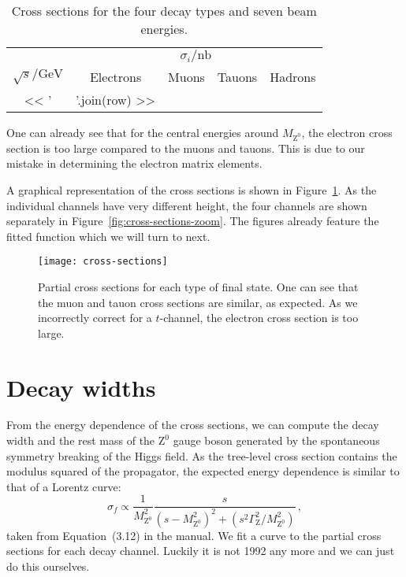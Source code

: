 \documentclass[11pt, english, fleqn, DIV=15, headinclude, BCOR=2cm]{scrreprt}
\newcommand\MZ{M_{\mathrm Z^0}}
\begin{document}
\begin{table}
    \centering
    \begin{tabular}{SSSSS}
        \toprule
        &  \\
        \cmidrule(l){2-5}
        {$\sqrt s / \si{\giga\electronvolt}$}
        & {Electrons}
        & {Muons}
        & {Tauons}
        & {Hadrons} \\
        \midrule
        << ' & '.join(row) >> \\
        \bottomrule
    \end{tabular}
    \caption{%
        Cross sections for the four decay types and seven beam energies.
    }
    \label{tab:cross-sections}
\end{table}

One can already see that for the central energies around $\MZ$, the electron
cross section is too large compared to the muons and tauons. This is due to our
mistake in determining the electron matrix elements.

A graphical representation of the cross sections is shown in
Figure~\ref{fig:cross-sections}. As the individual channels have very different
height, the four channels are shown separately in
Figure~\ref{fig:cross-sections-zoom}. The figures already feature the fitted
function which we will turn to next.

\begin{figure}
    \centering
    \texttt{[image: cross-sections]}
    \caption{%
        Partial cross sections for each type of final state. One can see that
        the muon and tauon cross sections are similar, as expected. As we
        incorrectly correct for a $t$-channel, the electron cross section is
        too large.
    }
    \label{fig:cross-sections}
\end{figure}



\section{Decay widths}

From the energy dependence of the cross sections, we can compute the decay
width and the rest mass of the $\mathrm Z^0$ gauge boson generated by the
spontaneous symmetry breaking of the Higgs field. As the tree-level cross
section contains the modulus squared of the propagator, the expected energy
dependence is similar to that of a Lorentz curve:
\[
    \sigma_f \propto \frac{1}{\MZ^2} \frac{s}{(s - \MZ^2)^2 + (s^2
    \Gamma_\mathrm Z^2 / \MZ^2)} \,,
\]
taken from Equation~(3.12) in the manual. We fit a curve to the partial cross
sections for each decay channel. Luckily it is not 1992 any more and we can
just do this ourselves.
\end{document}
